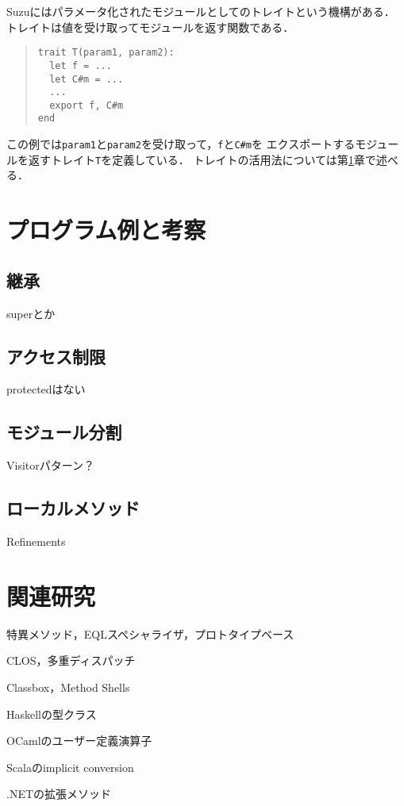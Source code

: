 \documentclass[a4paper,11pt,dvipdfmx]{jreport}
\begin{document}
Suzuにはパラメータ化されたモジュールとしてのトレイトという機構がある．
トレイトは値を受け取ってモジュールを返す関数である．
\begin{quote}
\begin{verbatim}
trait T(param1, param2):
  let f = ...
  let C#m = ...
  ...
  export f, C#m
end
\end{verbatim}
\end{quote}
この例では\verb|param1|と\verb|param2|を受け取って，\verb|f|と\verb|C#m|を
エクスポートするモジュールを返すトレイト\verb|T|を定義している．
トレイトの活用法については第\ref{chapter:discussion}章で述べる．


\chapter{プログラム例と考察}
\label{chapter:discussion}

\section{継承}
superとか

\section{アクセス制限}
protectedはない

\section{モジュール分割}
Visitorパターン？

\section{ローカルメソッド}
Refinements

\chapter{関連研究}
\label{chapter:related-work}

特異メソッド，EQLスペシャライザ，プロトタイプベース

CLOS，多重ディスパッチ

Classbox，Method Shells

Haskellの型クラス

OCamlのユーザー定義演算子

Scalaのimplicit conversion

.NETの拡張メソッド
\end{document}
